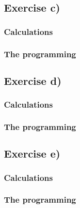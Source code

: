 \documentclass{article}
\begin{document}
\subsection{Exercise c)} \label{sec:Method c)}

  \subsubsection{Calculations}




  \subsubsection{The programming}




\subsection{Exercise d)} \label{sec:Method d)}

  \subsubsection{Calculations}




  \subsubsection{The programming}



\subsection{Exercise e)} \label{sec:Method e)}


  \subsubsection{Calculations}




  \subsubsection{The programming}





\vspace{1cm}
\end{document}

